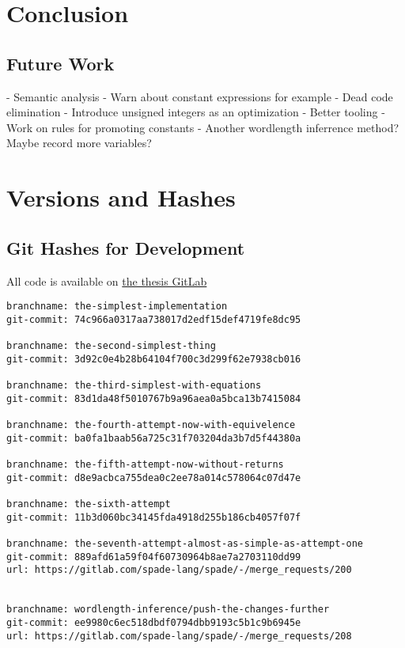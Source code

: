 \documentclass[msc,lith,english]{liuthesis}
\begin{document}
\section{}

\chapter{Conclusion}
\label{cha:Conclusion}

\section{Future Work}
  - Semantic analysis
      - Warn about constant expressions for example
      - Dead code elimination
  - Introduce unsigned integers as an optimization
  - Better tooling
  - Work on rules for promoting constants
  - Another wordlength inferrence method? Maybe record more variables?

\clearpage

\printbibliography

\appendix
\chapter{Versions and Hashes}
\label{app:VersionsAndGitHashes}
\section{Git Hashes for Development}
All code is available on \href{https://gitlab.com/FredTheDino/spade}{the thesis GitLab}
\begin{verbatim}
branchname: the-simplest-implementation
git-commit: 74c966a0317aa738017d2edf15def4719fe8dc95

branchname: the-second-simplest-thing
git-commit: 3d92c0e4b28b64104f700c3d299f62e7938cb016

branchname: the-third-simplest-with-equations
git-commit: 83d1da48f5010767b9a96aea0a5bca13b7415084

branchname: the-fourth-attempt-now-with-equivelence
git-commit: ba0fa1baab56a725c31f703204da3b7d5f44380a

branchname: the-fifth-attempt-now-without-returns
git-commit: d8e9acbca755dea0c2ee78a014c578064c07d47e

branchname: the-sixth-attempt
git-commit: 11b3d060bc34145fda4918d255b186cb4057f07f

branchname: the-seventh-attempt-almost-as-simple-as-attempt-one
git-commit: 889afd61a59f04f60730964b8ae7a2703110dd99
url: https://gitlab.com/spade-lang/spade/-/merge_requests/200


branchname: wordlength-inference/push-the-changes-further
git-commit: ee9980c6ec518dbdf0794dbb9193c5b1c9b6945e
url: https://gitlab.com/spade-lang/spade/-/merge_requests/208
\end{verbatim}
\end{document}
